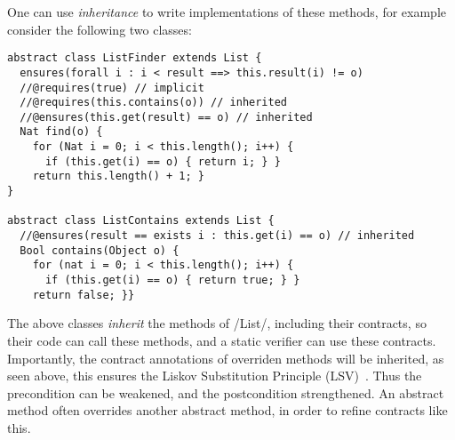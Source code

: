 One can use \emph{inheritance} to write implementations of these methods, for example consider the following two classes:
\begin{lstlisting}
abstract class ListFinder extends List {
  ensures(forall i : i < result ==> this.result(i) != o)
  //@requires(true) // implicit
  //@requires(this.contains(o)) // inherited
  //@ensures(this.get(result) == o) // inherited
  Nat find(o) {
    for (Nat i = 0; i < this.length(); i++) {
      if (this.get(i) == o) { return i; } }
    return this.length() + 1; }
}

abstract class ListContains extends List {
  //@ensures(result == exists i : this.get(i) == o) // inherited
  Bool contains(Object o) {
    for (nat i = 0; i < this.length(); i++) {
      if (this.get(i) == o) { return true; } }
    return false; }}
\end{lstlisting}

The above classes \emph{inherit} the methods of /List/, including their contracts, so their code can call these methods, and a static verifier can use these contracts. Importantly, the contract annotations of overriden methods will be inherited, as seen above, this ensures the Liskov Substitution Principle (LSV)~\cite{?}. Thus the precondition can be weakened, and the postcondition strengthened. An abstract method often overrides another abstract method, in order to refine contracts like this.

